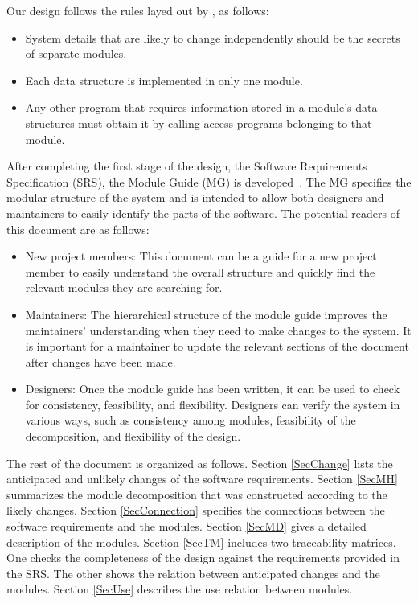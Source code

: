 \documentclass[12pt, titlepage]{article}
\begin{document}
Our design follows the rules layed out by \citet{ParnasEtAl1984}, as follows:
\begin{itemize}
	\item System details that are likely to change independently should be the secrets of separate modules.
	\item Each data structure is implemented in only one module.
	\item Any other program that requires information stored in a module's data structures must obtain it by
	      calling access programs belonging to that module.
\end{itemize}

After completing the first stage of the design, the Software Requirements Specification (SRS), the
Module Guide (MG) is developed~\citep{ParnasEtAl1984}. The MG specifies the modular structure of
the system and is intended to allow both designers and maintainers to easily identify the parts of
the software. The potential readers of this document are as follows:

\begin{itemize}
	\item New project members: This document can be a guide for a new project member to easily understand the
	      overall structure and quickly find the relevant modules they are searching for.
	\item Maintainers: The hierarchical structure of the module guide improves the maintainers' understanding
	      when they need to make changes to the system. It is important for a maintainer to update the
	      relevant sections of the document after changes have been made.
	\item Designers: Once the module guide has been written, it can be used to check for consistency,
	      feasibility, and flexibility. Designers can verify the system in various ways, such as consistency
	      among modules, feasibility of the decomposition, and flexibility of the design.
\end{itemize}

The rest of the document is organized as follows. Section \ref{SecChange} lists the anticipated and
unlikely changes of the software requirements. Section \ref{SecMH} summarizes the module
decomposition that was constructed according to the likely changes. Section \ref{SecConnection}
specifies the connections between the software requirements and the modules. Section \ref{SecMD}
gives a detailed description of the modules. Section \ref{SecTM} includes two traceability
matrices. One checks the completeness of the design against the requirements provided in the SRS.
The other shows the relation between anticipated changes and the modules. Section \ref{SecUse}
describes the use relation between modules.
\end{document}
